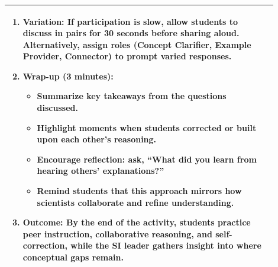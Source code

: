 \documentclass{article}
\begin{document}
{\begin{tabular}{|p{0.9\linewidth}|}
\begin{enumerate}
    \item \textbf{Variation:} If participation is slow, allow students to discuss in pairs for 30 seconds before sharing aloud. Alternatively, assign roles (Concept Clarifier, Example Provider, Connector) to prompt varied responses.
    
    \item \textbf{Wrap-up (3 minutes):}
    \begin{itemize}
        \item Summarize key takeaways from the questions discussed.
        \item Highlight moments when students corrected or built upon each other’s reasoning.
        \item Encourage reflection: ask, “What did you learn from hearing others’ explanations?”
        \item Remind students that this approach mirrors how scientists collaborate and refine understanding.
    \end{itemize}
    
    \item \textbf{Outcome:} By the end of the activity, students practice peer instruction, collaborative reasoning, and self-correction, while the SI leader gathers insight into where conceptual gaps remain.
\end{enumerate} \\
\hline
\end{tabular}

}
\end{document}
